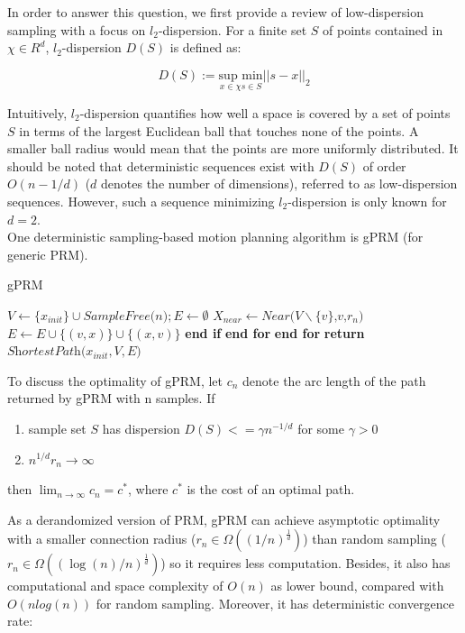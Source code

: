\documentclass[twoside]{article}
\begin{document}
In order to answer this question, we first provide a review of low-dispersion sampling with a focus on $l_2$-dispersion. For a finite set $S$ of points contained in $\chi \in R^d$, $l_2$-dispersion $D(S)$ is defined as:

\begin{equation}
    D(S) := \underset{x\in \chi s \in S}{\text{sup min}} ||s - x||_2
\end{equation}

Intuitively, $l_2$-dispersion quantifies how well a space is covered by a set of points $S$ in terms of the largest Euclidean ball that touches none of the points. A smaller ball radius would mean that the points are more uniformly distributed. It should be noted that deterministic sequences exist with $D(S)$ of order $O(n-1/d)$ ($d$ denotes the number of dimensions), referred to as low-dispersion sequences. However, such a sequence minimizing $l_2$-dispersion is only known for $d = 2$.\\

One deterministic sampling-based motion planning algorithm is gPRM (for generic PRM).

\begin{algorithm}
\caption{gPRM}\label{euclid}
\begin{algorithmic}[1]
\State $\textit{V} \gets \{x_{init}\} \cup \textit{SampleFree(n)}; E \gets \emptyset$
\State $X_{near} \gets  \textit{Near(V$\backslash$\{v\},v,$r_{n}$)}$
  	\State $E \gets E \cup \{(v,x)\} \cup \{(x,v)\}$
  \EndIf
  \State \textbf{end if}
 \EndFor
 \State \textbf{end for}
\EndFor
\State \textbf{end for}
\State \textbf{return} $\textit{ShortestPath($x_{init},V,E$)}$
\end{algorithmic}
\end{algorithm}

To discuss the optimality of gPRM, let $c_n$ denote the arc length of the path returned by gPRM with n samples. If
\begin{enumerate}
\item sample set $S$ has dispersion $D(S)<=\gamma n^{-1/d}$ for some $\gamma > 0$
\item $n^{1/d} r_n \rightarrow \infty$
\end{enumerate}
then $\lim_{n \to \infty} c_n = c^*$, where $c^*$ is the cost of an optimal path.

As a derandomized version of PRM, gPRM can achieve asymptotic optimality with a smaller connection radius ($r_n \in \Omega((1/n)^\frac{1}{d})$) than random sampling ($r_n \in \Omega((\log(n)/n)^\frac{1}{d})$) so it requires less computation. Besides, it also has computational and space complexity of $O(n)$ as lower bound, compared with $O(nlog(n))$ for random sampling. Moreover, it has deterministic convergence rate:
\end{document}
